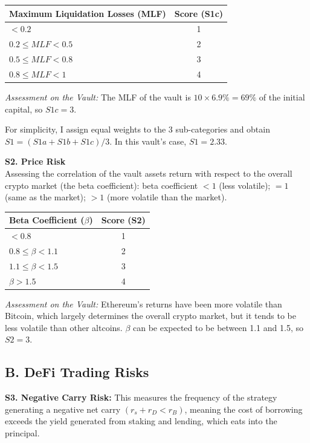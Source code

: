 \documentclass[11pt, a4paper]{article}
\begin{document}
\begin{tabularx}{0.6\textwidth}{@{} X c @{}}
\toprule
\textbf{Maximum Liquidation Losses (MLF)} & \textbf{Score (S1c)} \\
\midrule
$< 0.2$ & 1 \\
$0.2 \le MLF < 0.5$ & 2 \\
$0.5 \le MLF < 0.8$ & 3 \\
$0.8 \le MLF < 1$ & 4 \\
\bottomrule
\end{tabularx}

\textit{Assessment on the Vault:} The MLF of the vault is $10 \times 6.9\% = 69\%$ of the initial capital, so $S1c = 3$. 

For simplicity, I assign equal weights to the 3 sub-categories and obtain $S1 = (S1a + S1b + S1c) / 3$. In this vault's case, $S1 = 2.33$.

\textbf{S2. Price Risk} \\
Assessing the correlation of the vault assets return with respect to the overall crypto market (the beta coefficient): beta coefficient $< 1$ (less volatile); $= 1$ (same as the market); $> 1$ (more volatile than the market).

\begin{tabularx}{0.6\textwidth}{@{} X c @{}}
\toprule
\textbf{Beta Coefficient ($\beta$)} & \textbf{Score (S2)} \\
\midrule
$< 0.8$ & 1 \\
$0.8 \le \beta < 1.1$ & 2 \\
$1.1 \le \beta < 1.5$ & 3 \\
$\beta > 1.5$ & 4 \\
\bottomrule
\end{tabularx}

\textit{Assessment on the Vault:} Ethereum's returns have been more volatile than Bitcoin, which largely determines the overall crypto market, but it tends to be less volatile than other altcoins. $\beta$ can be expected to be between 1.1 and 1.5, so $S2 = 3$.

\subsection*{B. DeFi Trading Risks}

\textbf{S3. Negative Carry Risk:} This measures the frequency of the strategy generating a negative net carry $(r_s + r_D < r_B)$, meaning the cost of borrowing exceeds the yield generated from staking and lending, which eats into the principal.
\end{document}

